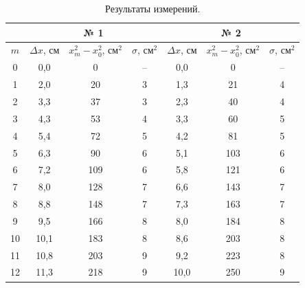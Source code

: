 \documentclass[a4paper,12pt]{article} %
\begin{document}
		\begin{table}[H]
			\caption{Результаты измерений.}
			\label{table:exp}
			\begin{tabular}{|c|c|c|c|c|c|c|}
				\hline
				& \multicolumn{3}{c|}{№ 1}                          & \multicolumn{3}{c|}{№ 2}                          \\ \hline
				$m$ & $\Delta x$, см & $x_m^2-x_0^2$, см$^2$ & $\sigma$, см$^2$ & $\Delta x$, см & $x_m^2-x_0^2$, см$^2$ & $\sigma$, см$^2$ \\ \hline
				0   & 0,0            & 0                     & --       & 0,0            & 0                     & --       \\ \hline
				1   & 2,0            & 20                    & 3        & 1,3            & 21                    & 4        \\ \hline
				2   & 3,3            & 37                    & 3        & 2,3            & 40                    & 4        \\ \hline
				3   & 4,3            & 53                    & 4        & 3,3            & 60                    & 5        \\ \hline
				4   & 5,4            & 72                    & 5        & 4,2            & 81                    & 5        \\ \hline
				5   & 6,3            & 90                    & 6        & 5,1            & 103                   & 6        \\ \hline
				6   & 7,2            & 109                   & 6        & 5,8            & 121                   & 6        \\ \hline
				7   & 8,0            & 128                   & 7        & 6,6            & 143                   & 7        \\ \hline
				8   & 8,8            & 148                   & 7        & 7,3            & 163                   & 7        \\ \hline
				9   & 9,5            & 166                   & 8        & 8,0            & 184                   & 8        \\ \hline
				10  & 10,1           & 183                   & 8        & 8,6            & 203                   & 8        \\ \hline
				11  & 10,8           & 203                   & 9        & 9,2            & 223                   & 8        \\ \hline
				12  & 11,3           & 218                   & 9        & 10,0           & 250                   & 9        \\ \hline

\end{tabular}
\end{table}
\end{document}
